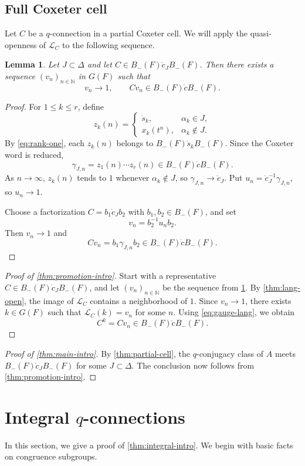 \documentclass[11pt]{amsart}
\numberwithin{equation}{section}
\newtheorem{lemma}[lemma]{Lemma}
\theoremstyle{definition}
\theoremstyle{remark}
\begin{document}
\subsection{Full Coxeter cell}
Let $C$ be a $q$-connection in a partial Coxeter cell. We will apply the quasi-openness of $\mathcal{L}_C$ to the following sequence.
\begin{lemma}\label{lem:coxeter-approximation}
Let $J\subset\Delta$ and let
$C\in B_-(F)\dot c_JB_-(F)$.  Then there exists a sequence
$(v_n)_{n\in\mathbb{N}}$ in $G(F)$ such that
\[
  v_n\longrightarrow 1,
  \qquad
  Cv_n\in B_-(F)\dot cB_-(F).
\]
\end{lemma}

\begin{proof}
For $1\leq k\leq r$, define
\[
  z_k(n)=
  \begin{cases}
    \dot s_{k},&\alpha_{k}\in J,\\
    x_{k}(t^n),&\alpha_{k}\notin J.
  \end{cases}
\]
By \eqref{eq:rank-one}, each $z_k(n)$ belongs to
$B_-(F)\dot s_{k}B_-(F)$.  Since the Coxeter word is reduced,
\[
  \gamma_{J,n}=z_1(n)\cdots z_r(n)
  \in B_-(F)\dot cB_-(F).
\]
As $n\to\infty$, $z_k(n)$ tends to $1$ whenever $\alpha_k\notin J$, so
$\gamma_{J,n}\to\dot c_J$.  Put
$u_n=\dot c_J^{-1}\gamma_{J,n}$, so $u_n\to 1$.

Choose a factorization $C=b_1\dot c_Jb_2$ with
$b_1,b_2\in B_-(F)$, and set
\[
  v_n=b_2^{-1}u_nb_2.
\]
Then $v_n\to 1$ and
\[
  Cv_n=b_1\gamma_{J,n}b_2
  \in B_-(F)\dot cB_-(F).
\]
\end{proof}

\begin{proof}[Proof of \cref{thm:promotion-intro}]
Start with a representative
$C\in B_-(F)\dot c_JB_-(F)$, and let $(v_n)_{n\in\mathbb{N}}$ be the
sequence from \cref{lem:coxeter-approximation}. By
\cref{thm:lang-open}, the image of $\mathcal{L}_C$ contains a neighborhood
of $1$. Since $v_n\rightarrow 1$, there exists
$k\in G(F)$ such that $\mathcal{L}_C(k)=v_n$ for some $n$. Using
\eqref{eq:gauge-lang}, we obtain
\[
  C^k=Cv_n\in B_-(F)\dot cB_-(F).
\]
\end{proof}
\begin{proof}[Proof of \cref{thm:main-intro}]
By \cref{thm:partial-cell}, the $q$-conjugacy class of $A$ meets
$B_-(F)\dot c_JB_-(F)$ for some $J\subset\Delta$. The conclusion now follows from \cref{thm:promotion-intro}.
\end{proof}
\section{Integral \texorpdfstring{$q$}{q}-connections}
\label{sec:rigidity}\label{app:altproof}
In this section, we give a proof of \cref{thm:integral-intro}. We begin with basic facts on congruence subgroups.
\end{document}
